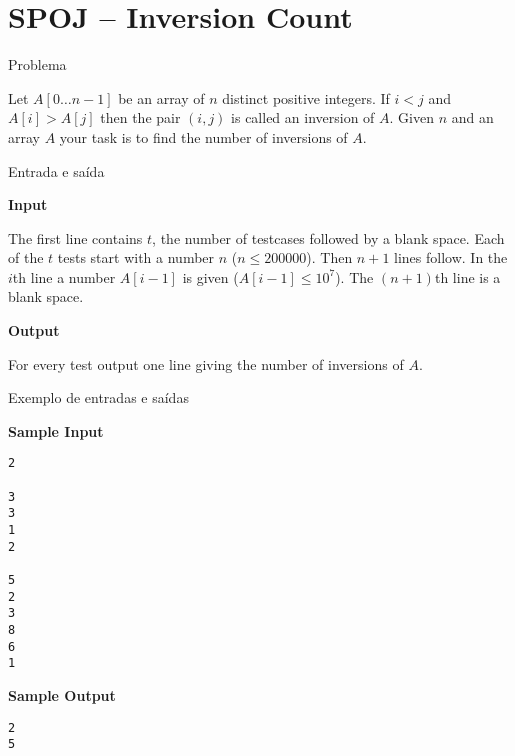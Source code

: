 \section{SPOJ -- Inversion Count}

\begin{frame}[fragile]{Problema}

Let $A[0\ldots n-1]$ be an array of $n$ distinct positive integers. If 
$i < j$ and $A[i] > A[j]$ then the pair $(i, j)$ is called an inversion of $A$. Given 
$n$ and an array $A$ your task is to find the number of inversions of $A$.

\end{frame}

\begin{frame}[fragile]{Entrada e saída}

\textbf{Input}

The first line contains $t$, the number of testcases followed by a blank space. Each of the $t$ 
tests start with a number $n$ ($n \leq 200000$). Then $n + 1$ lines follow. In the $i$th line a 
number $A[i - 1]$ is given ($A[i - 1] \leq 10^7$). The $(n + 1)$th line is a blank space.

\textbf{Output}

For every test output one line giving the number of inversions of $A$.

\end{frame}

\begin{frame}[fragile]{Exemplo de entradas e saídas}

\begin{minipage}[t]{0.5\textwidth}
\textbf{Sample Input}
\begin{verbatim}
2

3
3
1
2

5
2
3
8
6
1
\end{verbatim}
\end{minipage}
\begin{minipage}[t]{0.45\textwidth}
\textbf{Sample Output}
\begin{verbatim}
2
5
\end{verbatim}
\end{minipage}
\end{frame}


